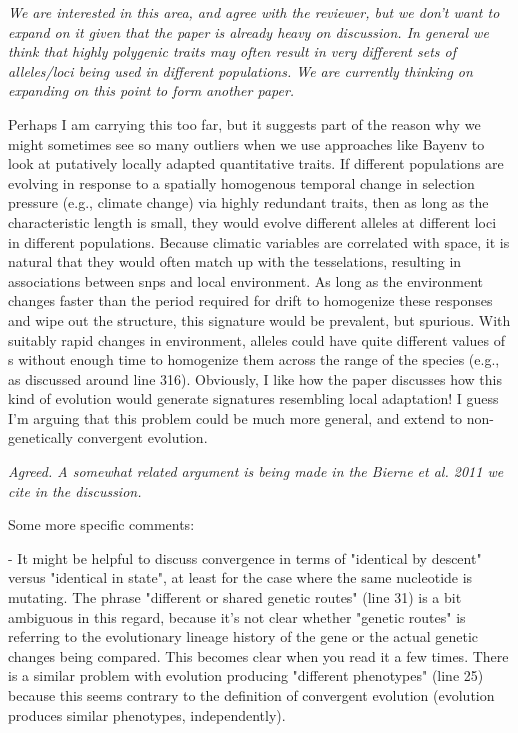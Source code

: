 \documentclass[12pt,letterpaper]{article}
\newcommand{\plr}[1]{{ \color{green} #1}}
\newcommand{\response}[1]{\emph{ \color{blue} #1}}
\begin{document}
\response{We are interested in this area, and agree with the reviewer, but we don't want to expand on it given that the paper is already heavy on discussion.  In general we think that highly polygenic traits may often result in very different sets of alleles/loci being used in different populations. We are currently thinking on expanding on this point to form another paper. }

Perhaps I am carrying this too far, but it suggests part of the reason why we might sometimes see so many outliers when we use approaches like Bayenv to look at putatively locally adapted quantitative traits. If different populations are evolving in response to a spatially homogenous temporal change in selection pressure (e.g., climate change) via highly redundant traits, then as long as the characteristic length is small, they would evolve different alleles at different loci in different populations. Because climatic variables are correlated with space, it is natural that they would often match up with the tesselations, resulting in associations between snps and local environment. As long as the environment changes faster than the period required for drift to homogenize these responses and wipe out the structure, this signature would be prevalent, but spurious. With suitably rapid changes in environment, alleles could have quite different values of s without enough time to homogenize them across the range of the species (e.g., as discussed around line 316). Obviously, I like how the paper discusses how this kind of evolution would generate signatures resembling local adaptation! I guess I'm arguing that this problem could be much more general, and extend to non-genetically convergent evolution.

\response{Agreed. A somewhat related argument is being made in the Bierne et al. 2011 we cite in the discussion.}

Some more specific comments:

- It might be helpful to discuss convergence in terms of "identical by descent" versus "identical in state", at least for the case where the same nucleotide is mutating. The phrase "different or shared genetic routes" (line 31) is a bit ambiguous in this regard, because it's not clear whether "genetic routes" is referring to the evolutionary lineage history of the gene or the actual genetic changes being compared. This becomes clear when you read it a few times. There is a similar problem with evolution producing "different phenotypes" (line 25) because this seems contrary to the definition of convergent evolution (evolution produces similar phenotypes, independently).
\end{document}
